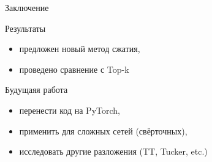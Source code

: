 \documentclass{beamer}
\begin{document}
\begin{frame}{Заключение}
    \begin{block}{Результаты}
    \begin{itemize}
        \item предложен новый метод сжатия,
        \item проведено сравнение с Top-k \cite{alistarh2018convergence}
    \end{itemize}
    \end{block}
    \begin{block}{Будущаяя работа}
    \begin{itemize}
        \item перенести код на PyTorch,
        \item применить для сложных сетей (свёрточных),
        \item исследовать другие разложения (TT, Tucker, etc.)
    \end{itemize}
    \end{block}
\end{frame}
\end{document}
